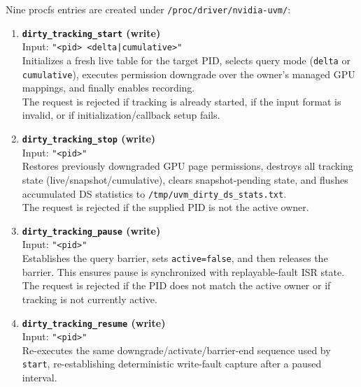 
Nine procfs entries are created under \texttt{/proc/driver/nvidia-uvm/}:

\begin{enumerate}
    \item \textbf{\texttt{dirty\_tracking\_start} (write)} \\ 
          Input: \texttt{"<pid> <delta|cumulative>"}\\
          Initializes a fresh live table for the target PID, selects query mode
          (\texttt{delta} or \texttt{cumulative}), executes permission downgrade
          over the owner's managed GPU mappings, and finally enables recording.\\
          The request is rejected if tracking is already started, if the input
          format is invalid, or if initialization/callback setup fails.\\

    \item \textbf{\texttt{dirty\_tracking\_stop} (write)} \\ 
          Input: \texttt{"<pid>"}\\
          Restores previously downgraded GPU page permissions, destroys all
          tracking state (live/snapshot/cumulative), clears snapshot-pending
          state, and flushes accumulated DS statistics to
          \texttt{/tmp/uvm\_dirty\_ds\_stats.txt}.\\
          The request is rejected if the supplied PID is not the active owner.\\

    \item \textbf{\texttt{dirty\_tracking\_pause} (write)} \\ 
          Input: \texttt{"<pid>"}\\
          Establishes the query barrier, sets \texttt{active=false}, and then
          releases the barrier. This ensures pause is synchronized with
          replayable-fault ISR state.\\
          The request is rejected if the PID does not match the active owner or
          if tracking is not currently active.\\

    \item \textbf{\texttt{dirty\_tracking\_resume} (write)} \\ 
          Input: \texttt{"<pid>"}\\
          Re-executes the same downgrade/activate/barrier-end sequence used by
          \texttt{start}, re-establishing deterministic write-fault capture
          after a paused interval.\\


\end{enumerate}
